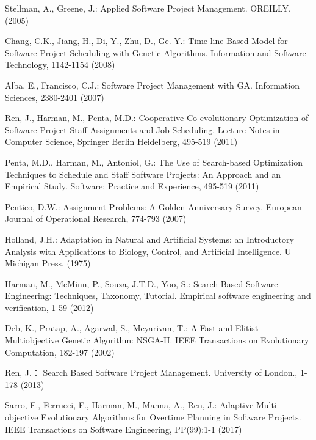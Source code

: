 %
\clearpage

\begin{thebibliography}{}
%
Stellman, A., Greene, J.:
Applied Software Project Management.
OREILLY, (2005)

Chang, C.K., Jiang, H., Di, Y., Zhu, D., Ge. Y.:
Time-line Based Model for Software Project Scheduling with Genetic Algorithms.
Information and Software Technology, 1142-1154 (2008)

Alba, E., Francisco, C.J.:
Software Project Management with GA.
Information Sciences, 2380-2401 (2007)

Ren, J., Harman, M., Penta, M.D.:
Cooperative Co-evolutionary Optimization of Software 
Project Staff Assignments and Job Scheduling.
Lecture Notes in Computer Science, Springer Berlin Heidelberg, 495-519 (2011)

Penta, M.D., Harman, M., Antoniol, G.:
The Use of Search-based Optimization Techniques to 
Schedule and Staff Software Projects: An Approach and an Empirical Study. 
Software: Practice and Experience, 495-519 (2011)

Pentico, D.W.:
Assignment Problems: A Golden Anniversary Survey.
European Journal of Operational Research, 774-793 (2007)

Holland, J.H.:
Adaptation in Natural and Artificial Systems: an Introductory 
Analysis with Applications to Biology, Control, and Artificial Intelligence.
U Michigan Press, (1975)

Harman, M., McMinn, P., Souza, J.T.D., Yoo, S.:
Search Based Software Engineering: Techniques, Taxonomy, Tutorial.
Empirical software engineering and verification, 1-59 (2012)

Deb, K., Pratap, A., Agarwal, S., Meyarivan, T.:
A Fast and Elitist Multiobjective Genetic Algorithm: NSGA-II.
IEEE Transactions on Evolutionary Computation, 182-197 (2002)

Ren, J.：
Search Based Software Project Management.
University of London., 1-178 (2013)

Sarro, F., Ferrucci, F., Harman, M., Manna, A., Ren, J.:
Adaptive Multi-objective Evolutionary Algorithms for Overtime Planning in Software Projects.
IEEE Transactions on Software Engineering, PP(99):1-1 (2017)


\end{thebibliography}
